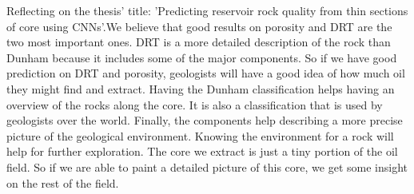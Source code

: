 Reflecting on the thesis' title: 'Predicting reservoir rock quality from thin sections of core using CNNs'.We believe that good results on porosity and DRT are the two most important ones. DRT is a more detailed description of the rock than Dunham because it includes some of the major components. So if we have good prediction on DRT and porosity, geologists will have a good idea of how much oil they might find and extract. Having the Dunham classification helps having an overview of the rocks along the core. It is also a classification that is used by geologists over the world. Finally, the components help describing a more precise picture of the geological environment. Knowing the environment for a rock will help for further exploration. The core we extract is just a tiny portion of the oil field. So if we are able to paint a detailed picture of this core, we get some insight on the rest of the field. 